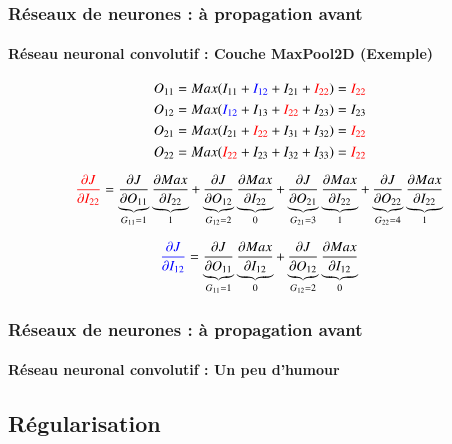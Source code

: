 \documentclass[xcolor=table]{beamer}
\begin{document}
\begin{frame}
	\frametitle{Réseaux de neurones : à propagation avant}
	\framesubtitle{Réseau neuronal convolutif : Couche MaxPool2D (Exemple)}
	
	
	\begin{center}
		\vskip-6pt
	\end{center}\vskip-16pt
	
	{\scriptsize 
		\[O_{11} = Max(I_{11} + \textcolor{blue}{I_{12}} + I_{21} + \textcolor{red}{I_{22}}) = \textcolor{red}{I_{22}}  \]
		\[O_{12} = Max(\textcolor{blue}{I_{12}} + I_{13} + \textcolor{red}{I_{22}} + I_{23}) = I_{23}  \]
		\[O_{21} = Max(I_{21} + \textcolor{red}{I_{22}} + I_{31} + I_{32}) = \textcolor{red}{I_{22}} \]
		\[O_{22} = Max(\textcolor{red}{I_{22}} + I_{23} + I_{32} + I_{33}) = \textcolor{red}{I_{22}}  \]
		
		\[\textcolor{red}{\frac{\partial J}{\partial I_{22}}} 
		= \underbrace{\frac{\partial J}{\partial O_{11}}}_{G_{11} = 1} 
		\underbrace{\frac{\partial Max}{\partial I_{22}}}_{1}
		+ \underbrace{\frac{\partial J}{\partial O_{12}}}_{G_{12} = 2} 
		\underbrace{\frac{\partial Max}{\partial I_{22}}}_{0}
		+ \underbrace{\frac{\partial J}{\partial O_{21}}}_{G_{21} = 3} 
		\underbrace{\frac{\partial Max}{\partial I_{22}}}_{1}
		+ \underbrace{\frac{\partial J}{\partial O_{22}}}_{G_{22} = 4} 
		\underbrace{\frac{\partial Max}{\partial I_{22}}}_{1}\]
		
		\[\textcolor{blue}{\frac{\partial J}{\partial I_{12}}} 
		= \underbrace{\frac{\partial J}{\partial O_{11}}}_{G_{11} = 1} 
		\underbrace{\frac{\partial Max}{\partial I_{12}}}_{0}
		+ \underbrace{\frac{\partial J}{\partial O_{12}}}_{G_{12} = 2} 
		\underbrace{\frac{\partial Max}{\partial I_{12}}}_{0}\]
	}
	
\end{frame}

\begin{frame}
\frametitle{Réseaux de neurones : à propagation avant}
\framesubtitle{Réseau neuronal convolutif : Un peu d'humour}

\begin{center}
\end{center}

\end{frame}

\subsection{Régularisation}
\end{document}
